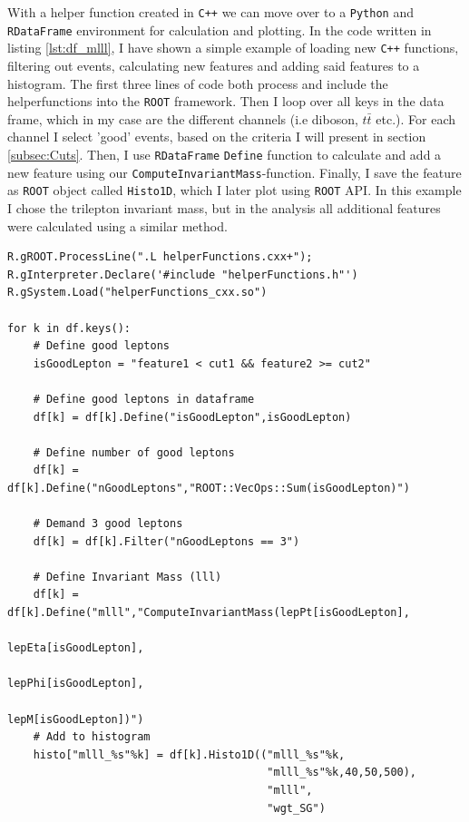 With a helper function created in \verb!C++! we can move over to a \verb!Python! and \verb!RDataFrame! environment
for calculation and plotting. In the code written in listing \ref{lst:df_mlll}, I have shown a simple example 
of loading new \verb!C++! functions, filtering out events, calculating new features and adding said 
features to a histogram. The first three lines of code both process and include the helperfunctions 
into the \verb!ROOT! framework. Then I loop over all keys in the data frame, which in my case
are the different channels (i.e diboson, $t\bar{t}$ etc.). For each channel I select 'good' events,
based on the criteria I will present in section \ref{subsec:Cuts}. Then, I use \verb!RDataFrame! \verb!Define! function to calculate
and add a new feature using our \verb!ComputeInvariantMass!-function. Finally, I save the feature as \verb!ROOT! object called 
\verb!Histo1D!, which I later plot using \verb!ROOT! \ac{API}. In this example I chose the trilepton invariant mass, 
but in the analysis all additional features were calculated using a similar method. 
\lstset{style=Python}
\begin{lstlisting}[caption={Python-file for calling dataframe and calculating $M_{lll}$.},captionpos=b, label={lst:df_mlll}]
R.gROOT.ProcessLine(".L helperFunctions.cxx+");
R.gInterpreter.Declare('#include "helperFunctions.h"') 
R.gSystem.Load("helperFunctions_cxx.so")

for k in df.keys():
    # Define good leptons
    isGoodLepton = "feature1 < cut1 && feature2 >= cut2"

    # Define good leptons in dataframe
    df[k] = df[k].Define("isGoodLepton",isGoodLepton)

    # Define number of good leptons
    df[k] = df[k].Define("nGoodLeptons","ROOT::VecOps::Sum(isGoodLepton)")

    # Demand 3 good leptons 
    df[k] = df[k].Filter("nGoodLeptons == 3")

    # Define Invariant Mass (lll)
    df[k] = df[k].Define("mlll","ComputeInvariantMass(lepPt[isGoodLepton], 
                                                      lepEta[isGoodLepton], 
                                                      lepPhi[isGoodLepton], 
                                                      lepM[isGoodLepton])")
    # Add to histogram
    histo["mlll_%s"%k] = df[k].Histo1D(("mlll_%s"%k,
                                        "mlll_%s"%k,40,50,500),
                                        "mlll",
                                        "wgt_SG")     
\end{lstlisting}



